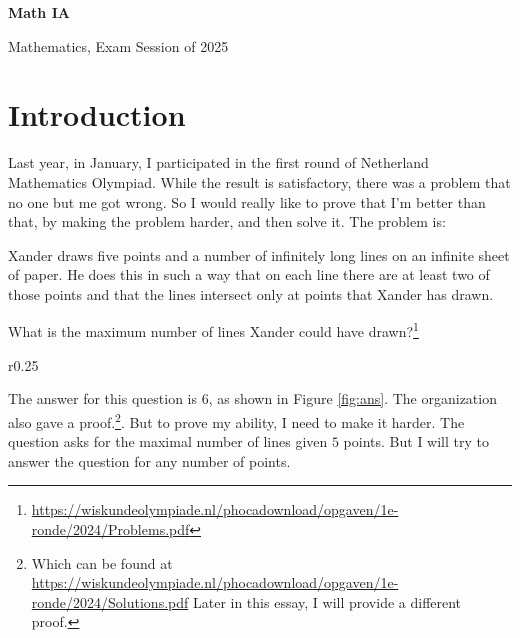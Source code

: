 \documentclass[a4paper, 12pt]{article}
\begin{document}
\begin{titlepage}
\begin{center}
\vspace*{4cm}
{\huge\textbf{Math IA}}
\end{center}
\vspace{1cm}
\begin{flushright}
Mathematics, Exam Session of 2025\\
\end{flushright}
\end{titlepage}

\tableofcontents
\clearpage

\section{Introduction}
Last year, in January, I participated in the first round of Netherland Mathematics Olympiad. While the result is satisfactory, there was a problem that no one but me got wrong. So I would really like to prove that I'm better than that, by making the problem harder, and then solve it.
The problem is:

\begin{displayquote}
Xander draws five points and a number of infinitely long lines on an infinite sheet of paper. He does this in such a way that on each line there are at least two of those points and that the lines intersect only at points that Xander has drawn.

What is the maximum number of lines Xander could have drawn?\footnote{\href{https://wiskundeolympiade.nl/phocadownload/opgaven/1e-ronde/2024/Problems.pdf}{https://wiskundeolympiade.nl/phocadownload/opgaven/1e-ronde/2024/Problems.pdf}}
\end{displayquote}

\begin{wrapfigure}{r}{0.25\textwidth}
    \vspace{-0.8\baselineskip}
    
    \caption{answer to the original problem}
    \label{fig:ans}
    \vspace{-1\baselineskip}
\end{wrapfigure}
The answer for this question is $6$, as shown in Figure \ref{fig:ans}. The organization also gave a proof.\footnote{Which can be found at \href{https://wiskundeolympiade.nl/phocadownload/opgaven/1e-ronde/2024/Solutions.pdf}{https://wiskundeolympiade.nl/phocadownload/opgaven/1e-ronde/2024/Solutions.pdf} Later in this essay, I will provide a different proof.}. But to prove my ability, I need to make it harder. The question asks for the maximal number of lines given $5$ points. But I will try to answer the question for any number of points.
\end{document}

